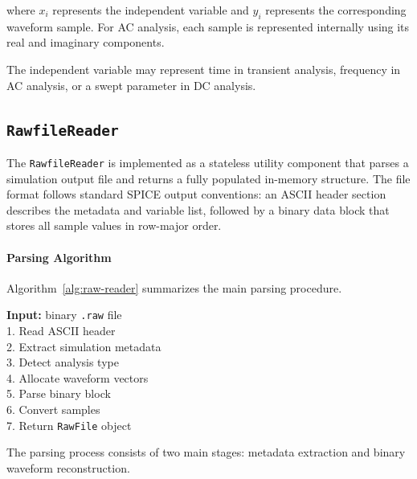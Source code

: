 where $x_i$ represents the independent variable and $y_i$ represents the corresponding waveform sample. For AC analysis, each sample is represented internally using its real and imaginary components.

The independent variable may represent time in transient analysis, frequency in AC analysis, or a swept parameter in DC analysis.

\subsection{\texttt{RawfileReader}}
\label{subsec:rawfile-reader}

The \texttt{RawfileReader} is implemented as a stateless utility component that parses a simulation output file and returns a fully populated in-memory structure.  The file format follows standard SPICE output conventions: an ASCII header section describes the metadata and variable list, followed by a binary data block that stores all sample values in row-major order.

\paragraph{Parsing Algorithm}

Algorithm~\ref{alg:raw-reader} summarizes the main parsing procedure.

\begin{algorithm}[H]
\caption{ReadRawFile}
\label{alg:raw-reader}
\textbf{Input:} binary \texttt{.raw} file \\
1. Read ASCII header \\
2. Extract simulation metadata \\
3. Detect analysis type \\
4. Allocate waveform vectors \\
5. Parse binary block \\
6. Convert samples \\
7. Return \texttt{RawFile} object
\end{algorithm}

The parsing process consists of two main stages: metadata extraction and binary waveform reconstruction.
\newpage

